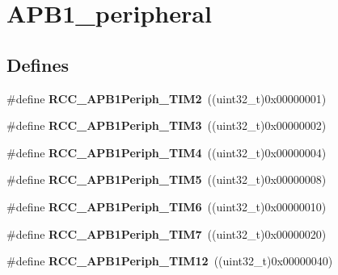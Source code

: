 \hypertarget{group__APB1__peripheral}{
\section{APB1\_\-peripheral}
\label{group__APB1__peripheral}
}
\subsection*{Defines}
\begin{DoxyCompactItemize}
\item 
\hypertarget{group__APB1__peripheral_ga742bab2f04cebe587574b53f7107aeaf}{
\#define {\bfseries RCC\_\-APB1Periph\_\-TIM2}~((uint32\_\-t)0x00000001)}
\label{group__APB1__peripheral_ga742bab2f04cebe587574b53f7107aeaf}

\item 
\hypertarget{group__APB1__peripheral_gad4454f63a511a256e55aad55c03beb76}{
\#define {\bfseries RCC\_\-APB1Periph\_\-TIM3}~((uint32\_\-t)0x00000002)}
\label{group__APB1__peripheral_gad4454f63a511a256e55aad55c03beb76}

\item 
\hypertarget{group__APB1__peripheral_ga80f9f3720804a97210b723696bd94d83}{
\#define {\bfseries RCC\_\-APB1Periph\_\-TIM4}~((uint32\_\-t)0x00000004)}
\label{group__APB1__peripheral_ga80f9f3720804a97210b723696bd94d83}

\item 
\hypertarget{group__APB1__peripheral_ga4905c26000a571fa01fc057fe31d254a}{
\#define {\bfseries RCC\_\-APB1Periph\_\-TIM5}~((uint32\_\-t)0x00000008)}
\label{group__APB1__peripheral_ga4905c26000a571fa01fc057fe31d254a}

\item 
\hypertarget{group__APB1__peripheral_ga4974e8b8f11d54fbc0bac1988ff6254c}{
\#define {\bfseries RCC\_\-APB1Periph\_\-TIM6}~((uint32\_\-t)0x00000010)}
\label{group__APB1__peripheral_ga4974e8b8f11d54fbc0bac1988ff6254c}

\item 
\hypertarget{group__APB1__peripheral_ga9415b0c46db5318bdee3f868c16b8d35}{
\#define {\bfseries RCC\_\-APB1Periph\_\-TIM7}~((uint32\_\-t)0x00000020)}
\label{group__APB1__peripheral_ga9415b0c46db5318bdee3f868c16b8d35}

\item 
\hypertarget{group__APB1__peripheral_ga0a4ec40233160ca20adaa571073e7bcd}{
\#define {\bfseries RCC\_\-APB1Periph\_\-TIM12}~((uint32\_\-t)0x00000040)}
\label{group__APB1__peripheral_ga0a4ec40233160ca20adaa571073e7bcd}


\end{DoxyCompactItemize}
